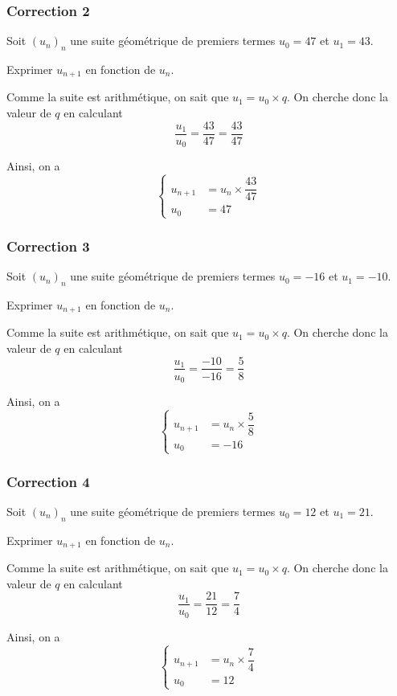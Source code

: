 \documentclass[15pt, mathserif]{beamer}
\begin{document}
\begin{frame}
\vspace{-10mm}
	\frametitle{Correction 2}
Soit $(u_n)_n$ une suite géométrique de premiers termes $u_0=47$ et $u_1=43$. 
 
 Exprimer $u_{n+1}$ en fonction de $u_n$. 
 
 \vspace*{1cm} 
 
 Comme la suite est arithmétique, on sait que $u_1=u_0\times q$. On cherche donc la valeur de $q$ en calculant $$\dfrac{u_1}{u_0}=\dfrac{43}{47}=\dfrac{43}{47}$$ 
 
 Ainsi, on a $$ \left\{ 
 \begin{array}{ll} 
 u_{n+1} &= u_n \times \dfrac{43}{47} \\ 
 u_0 & = 47 
 \end{array} 
 \right. $$ 
 \end{frame}


\begin{frame}
\vspace{-10mm}
	\frametitle{Correction 3}
Soit $(u_n)_n$ une suite géométrique de premiers termes $u_0=-16$ et $u_1=-10$. 
 
 Exprimer $u_{n+1}$ en fonction de $u_n$. 
 
 \vspace*{1cm} 
 
 Comme la suite est arithmétique, on sait que $u_1=u_0\times q$. On cherche donc la valeur de $q$ en calculant $$\dfrac{u_1}{u_0}=\dfrac{-10}{-16}=\dfrac{5}{8}$$ 
 
 Ainsi, on a $$ \left\{ 
 \begin{array}{ll} 
 u_{n+1} &= u_n \times \dfrac{5}{8} \\ 
 u_0 & = -16 
 \end{array} 
 \right. $$ 
 \end{frame}


\begin{frame}
\vspace{-10mm}
	\frametitle{Correction 4}
Soit $(u_n)_n$ une suite géométrique de premiers termes $u_0=12$ et $u_1=21$. 
 
 Exprimer $u_{n+1}$ en fonction de $u_n$. 
 
 \vspace*{1cm} 
 
 Comme la suite est arithmétique, on sait que $u_1=u_0\times q$. On cherche donc la valeur de $q$ en calculant $$\dfrac{u_1}{u_0}=\dfrac{21}{12}=\dfrac{7}{4}$$ 
 
 Ainsi, on a $$ \left\{ 
 \begin{array}{ll} 
 u_{n+1} &= u_n \times \dfrac{7}{4} \\ 
 u_0 & = 12 
 \end{array} 
 \right. $$ 
 \end{frame}
\end{document}
